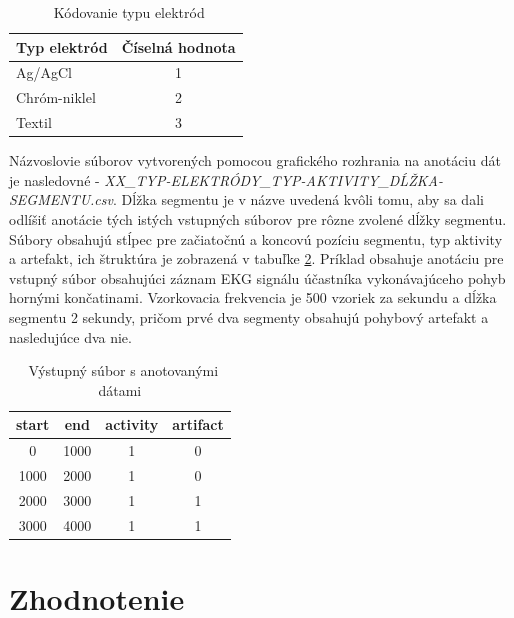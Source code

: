 \begin{table}[H]\centering
\caption[]{~Kódovanie typu elektród}\label{tab:labels_electrode}
    \begin{tabular}{l|c}
    	\textbf{Typ elektród}  & \textbf{Číselná hodnota}     \tabularnewline \hline 
     	Ag/AgCl                & 1	                          \tabularnewline \hline
     	Chróm-niklel	       & 2	                          \tabularnewline \hline
        Textil	               & 3	                          \tabularnewline
    \end{tabular}
\end{table}

Názvoslovie súborov vytvorených pomocou grafického rozhrania na anotáciu dát je nasledovné - \textit{XX\_TYP-ELEKTRÓDY\_TYP-AKTIVITY\_DĹŽKA-SEGMENTU.csv}. Dĺžka segmentu je v názve uvedená kvôli tomu, aby sa dali odlíšiť anotácie tých istých vstupných súborov pre rôzne zvolené dĺžky segmentu. Súbory obsahujú stĺpec pre začiatočnú a koncovú pozíciu segmentu, typ aktivity a artefakt, ich štruktúra je zobrazená v tabuľke \ref{tab:output}. Príklad obsahuje anotáciu pre vstupný súbor obsahujúci záznam EKG signálu účastníka vykonávajúceho pohyb hornými končatinami. Vzorkovacia frekvencia je 500 vzoriek za sekundu a dĺžka segmentu 2 sekundy, pričom prvé dva segmenty obsahujú pohybový artefakt a nasledujúce dva nie. 

\begin{table}[H]\centering
\caption[]{~Výstupný súbor s anotovanými dátami}\label{tab:output}
    \begin{tabular}{c|c|c|c}
    	\textbf{start} & \textbf{end} & \textbf{activity} & \textbf{artifact}  \tabularnewline \hline 
     	0		       & 1000		  & 1	              & 0	               \tabularnewline \hline
     	1000	       & 2000	      & 1	              & 0	               \tabularnewline \hline
        2000	       & 3000	      & 1	              & 1	               \tabularnewline \hline
        3000	       & 4000	      & 1	              & 1	               \tabularnewline
    \end{tabular}
\end{table}



\chapter{Zhodnotenie}
